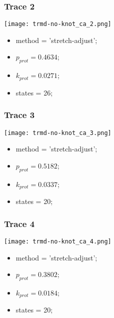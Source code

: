 \begin{minipage}[c]{0.45\textwidth}
\subsubsection{Trace 2}
\begin{minipage}[c]{0.7\textwidth}
    \texttt{[image: trmd-no-knot\_ca\_2.png]}
\end{minipage}
\hfill
\begin{minipage}[c]{0.45\textwidth}
    \begin{itemize}
        \item method = 'stretch-adjust';
        \item $p_{prot}=0.4634$;
        \item $k_{prot}=0.0271$;
        \item states = 26;
    \end{itemize}
\end{minipage}

\subsubsection{Trace 3}
\begin{minipage}[c]{0.7\textwidth}
    \texttt{[image: trmd-no-knot\_ca\_3.png]}
\end{minipage}
\hfill
\begin{minipage}[c]{0.45\textwidth}
    \begin{itemize}
        \item method = 'stretch-adjust';
        \item $p_{prot}=0.5182$;
        \item $k_{prot}=0.0337$;
        \item states = 20;
    \end{itemize}
\end{minipage}

\subsubsection{Trace 4}
\begin{minipage}[c]{0.7\textwidth}
    \texttt{[image: trmd-no-knot\_ca\_4.png]}
\end{minipage}
\hfill
\begin{minipage}[c]{0.45\textwidth}
    \begin{itemize}
        \item method = 'stretch-adjust';
        \item $p_{prot}=0.3802$;
        \item $k_{prot}=0.0184$;
        \item states = 20;
    \end{itemize}
\end{minipage}


\end{minipage}
